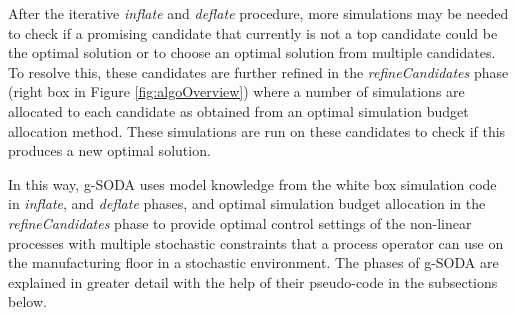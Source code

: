 \documentclass[a4paper, 12pt]{article} %
\begin{document}
After the iterative \textit{inflate} and \textit{deflate} procedure, more simulations may be needed to check if a promising candidate that currently is not a top candidate could be the optimal solution or to choose an optimal solution from multiple candidates. 
To resolve this, these candidates are further refined in the \textit{refineCandidates} phase (right box in Figure \ref{fig:algoOverview}) where a number of simulations are allocated to each candidate as obtained from an optimal simulation budget allocation method. These simulations are run on these candidates to check if this produces a new optimal solution.

In this way, g-SODA uses model knowledge from the white box simulation code in \textit{inflate}, and \textit{deflate} phases, and optimal simulation budget allocation in the \textit{refineCandidates} phase to provide optimal control settings of the non-linear processes with multiple stochastic constraints that a process operator can use on the manufacturing floor in a stochastic environment. The phases of g-SODA are explained in greater detail with the help of their pseudo-code in the subsections below.
\end{document}
